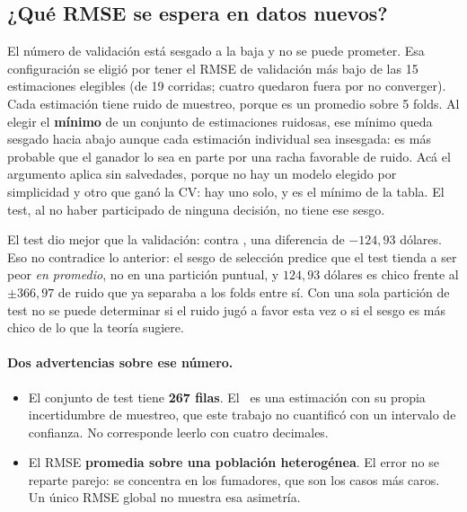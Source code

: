 \documentclass[11pt,a4paper]{article}
\begin{document}
\subsection{¿Qué RMSE se espera en datos nuevos?}

\begin{center}
\end{center}

El número de validación está sesgado a la baja y no se puede prometer. Esa configuración se
eligió por tener el RMSE de validación más bajo de las 15 estimaciones elegibles (de 19
corridas; cuatro quedaron fuera por no converger). Cada estimación tiene ruido de muestreo,
porque es un promedio sobre 5 folds. Al elegir el \textbf{mínimo} de un conjunto de
estimaciones ruidosas, ese mínimo queda sesgado hacia abajo aunque cada estimación individual
sea insesgada: es más probable que el ganador lo sea en parte por una racha favorable de ruido.
Acá el argumento aplica sin salvedades, porque no hay un modelo elegido por simplicidad y otro
que ganó la CV: hay uno solo, y es el mínimo de la tabla. El test, al no haber participado de
ninguna decisión, no tiene ese sesgo.

El test dio mejor que la validación: \rmsetestproduccion{} contra \rmsevalproduccion{}, una
diferencia de $-124{,}93$ dólares. Eso no contradice lo anterior: el sesgo de selección predice
que el test tienda a ser peor \emph{en promedio}, no en una partición puntual, y $124{,}93$
dólares es chico frente al $\pm 366{,}97$ de ruido que ya separaba a los folds entre sí. Con
una sola partición de test no se puede determinar si el ruido jugó a favor esta vez o si el
sesgo es más chico de lo que la teoría sugiere.

\paragraph{Dos advertencias sobre ese número.}
\begin{itemize}
  \item El conjunto de test tiene \textbf{267 filas}. El \rmsetestproduccion\ es una estimación
        con su propia incertidumbre de muestreo, que este trabajo no cuantificó con un
        intervalo de confianza. No corresponde leerlo con cuatro decimales.
  \item El RMSE \textbf{promedia sobre una población heterogénea}. El error no se reparte
        parejo: se concentra en los fumadores, que son los casos más caros. Un único RMSE
        global no muestra esa asimetría.
\end{itemize}
\end{document}
